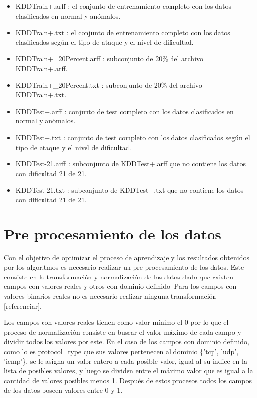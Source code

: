 \begin{itemize}
    \item KDDTrain+.arff : el conjunto de entrenamiento completo con los datos clasificados en normal y anómalos.
    \item KDDTrain+.txt : el conjunto de entrenamiento completo con los datos clasificados según el tipo de ataque y el nivel de dificultad.
    \item KDDTrain+\_20Percent.arff : subconjunto de 20\% del archivo KDDTrain+.arff.
    \item KDDTrain+\_20Percent.txt : subconjunto de 20\% del archivo KDDTrain+.txt.
    \item KDDTest+.arff : conjunto de test completo con los datos clasificados en normal y anómalos.
    \item KDDTest+.txt : conjunto de test completo con los datos clasificados según el tipo de ataque y el nivel de dificultad.
    \item KDDTest-21.arff : subconjunto de KDDTest+.arff que no contiene los datos con dificultad 21 de 21.
    \item KDDTest-21.txt : subconjunto de KDDTest+.txt que no contiene los datos con dificultad 21 de 21.
\end{itemize}

\section{Pre procesamiento de los datos}
Con el objetivo de optimizar el proceso de aprendizaje y los resultados obtenidos por los algoritmos es necesario realizar un pre procesamiento de los datos. Este consiste en la transformación y normalización de los datos dado que existen campos con valores reales y otros con dominio definido. Para los campos con valores binarios reales no es necesario realizar ninguna transformación [referenciar].

Los campos con valores reales tienen como valor mínimo el 0 por lo que el proceso de normalización consiste en buscar el valor máximo de cada campo y dividir todos los valores por este. En el caso de los campos con dominio definido, como lo es protocol\_type que sus valores pertenecen al dominio \{'tcp', 'udp', 'icmp'\}, se le asigna un valor entero a cada posible valor, igual al su indice en la lista de posibles valores, y luego se dividen entre el máximo valor que es igual a la cantidad de valores posibles menos 1. Después de estos procesos todos los campos de los datos poseen valores entre 0 y 1.

